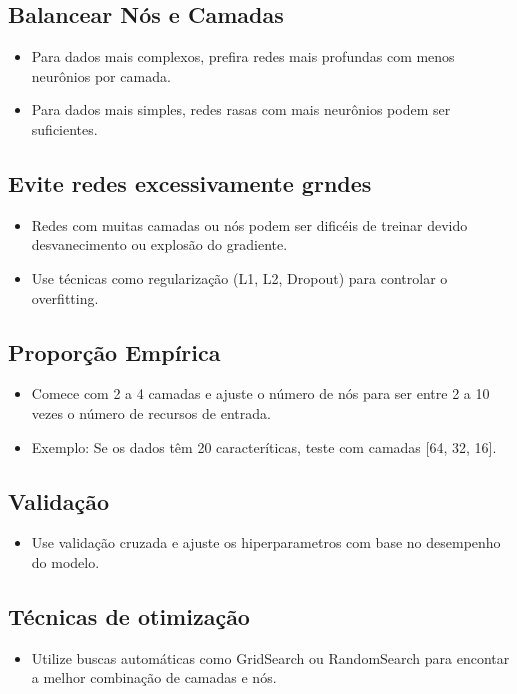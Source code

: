 \documentclass{article}
\begin{document}
\subsection{Balancear Nós e Camadas}
\begin{itemize}
    \item Para dados mais complexos, prefira redes mais profundas com menos neurônios por camada.
    \item Para dados mais simples, redes rasas com mais neurônios podem ser suficientes.
\end{itemize}
\subsection{Evite redes excessivamente grndes}
\begin{itemize}
    \item Redes com muitas camadas ou nós podem ser dificéis de treinar devido desvanecimento ou explosão do gradiente. 
    \item Use técnicas como regularização (L1, L2, Dropout) para controlar o overfitting.
\end{itemize}
\subsection{Proporção Empírica}
\begin{itemize}
    \item  Comece com 2 a 4 camadas e ajuste o número de nós para ser entre 2 a 10 vezes o número de recursos de entrada. 
    \item Exemplo: Se os dados têm 20 caracteríticas, teste com camadas [64, 32, 16].
\end{itemize}
\subsection{Validação}
\begin{itemize}
    \item Use validação cruzada e ajuste os hiperparametros com base no desempenho do modelo.
\end{itemize}
\subsection{Técnicas de otimização}
\begin{itemize}
    \item Utilize buscas automáticas como GridSearch ou RandomSearch para encontar a melhor combinação de camadas e nós.
\end{itemize}
\end{document}
